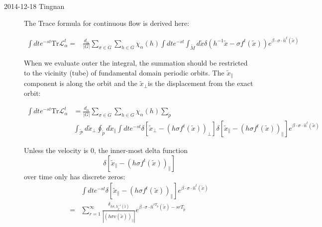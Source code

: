 \begin{description}
\item[2014-12-18 Tingnan]

The Trace formula for continuous flow is derived here:

\begin{align*}
\int dte^{-st}\mathrm{Tr}\mathcal{L}_{\alpha}^{t}= & \frac{d_{\alpha}}{\vert G\vert}\sum_{\sigma\in G}\sum_{h\in G}\chi_{\alpha}(h)\int dte^{-st}\int_{\tilde{M}}d\tilde{x}\delta(h^{-1}\tilde{x}-\sigma f^{t}(\tilde{x}))e^{\beta\cdot\sigma\cdot\hat{n}^{t}(\tilde{x})}
\end{align*}


When we evaluate outer the integral, the summation should be restricted
to the vicinity (tube) of fundamental domain periodic orbits. The
$\tilde{x}_{\parallel}$ component is along the orbit and the $\tilde{x}_{\perp}$is
the displacement from the exact orbit:

\begin{align*}
\int dte^{-st}\mathrm{Tr}\mathcal{L}_{\alpha}^{t} & =\frac{d_{\alpha}}{\vert G\vert}\sum_{\sigma\in G}\sum_{h\in G}\chi_{\alpha}(h)\sum_{\tilde{p}}\\
&\int_{\tilde{\mathcal{P}}}d\tilde{x}_{\perp}\oint_{\tilde{p}}d\tilde{x}_{\parallel}\int dte^{-st}\delta\left[\tilde{x}_{\perp}-\left(h\sigma f^{t}(\tilde{x})\right)_{\perp}\right]\delta\left[\tilde{x}_{\parallel}-\left(h\sigma f^{t}(\tilde{x})\right)_{\parallel}\right]e^{\beta\cdot\sigma\cdot\hat{n}^{t}(\tilde{x})}
\end{align*}


Unless the velocity is $0$, the
inner-most delta function 
\[
\delta\left[\tilde{x}_{\parallel}-\left(h\sigma f^{t}(\tilde{x})\right)_{\parallel}\right]
\]
 over time only has discrete zeros: 
\begin{align*}
 & \int dte^{-st}\delta\left[\tilde{x}_{\parallel}-\left(h\sigma f^{t}(\tilde{x})\right)_{\parallel}\right]e^{\beta\cdot\sigma\cdot\hat{n}^{t}(\tilde{x})}\\
= & \sum_{r=1}^{\infty}\frac{\delta_{h\sigma,h_{\tilde{p}}^{-r}(\tilde{x})}}{\left|\left(h\sigma v(\tilde{x})\right)_{\parallel}\right|}e^{\beta\cdot\sigma\cdot\hat{n}^{rT_{\tilde{p}}}(\tilde{x})-srT_{\tilde{p}}}
\end{align*}



\end{description}
